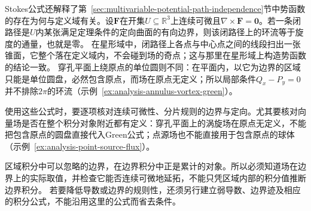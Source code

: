 Stokes公式还解释了第~\ref{sec:multivariable-potential-path-independence}节中势函数的存在为何与定义域有关。设$\bm F$在开集$U\subseteq\mathbb R^3$上连续可微且$\nabla\times\bm F=\bm0$。若一条闭路径是$U$内某张满足定理条件的定向曲面的有向边界，则该闭路径上的环流等于旋度的通量，也就是零。
在星形域中，闭路径上各点与中心点之间的线段扫出一张锥面，它整个落在定义域内，不会碰到场的奇点；这与那里在星形域上构造势函数的结论一致。
穿孔平面上绕原点的单位圆则不同：在平面内，以它为边界的区域只能是单位圆盘，必然包含原点，而场在原点无定义；所以局部条件$Q_x-P_y=0$并不排除$2\pi$的环流（示例~\ref{ex:analysis-annulus-vortex-green}）。

使用这些公式时，要逐项核对连续可微性、分片规则的边界与定向。尤其要核对向量场是否在整个积分对象附近都有定义：穿孔平面上的涡旋场在原点无定义，不能把包含原点的圆盘直接代入Green公式；点源场也不能直接用于包含原点的球体（示例~\ref{ex:analysis-point-source-flux}）。

区域积分中可以忽略的边界，在边界积分中正是累计的对象。所以必须知道场在边界上的实际取值，并检查它能否连续可微地延拓，不能只凭区域内部的积分值推断边界积分。
若要降低导数或边界的规则性，还须另行建立弱导数、边界迹及相应的积分公式，不能沿用这里的公式而省去条件。

\FloatBarrier
